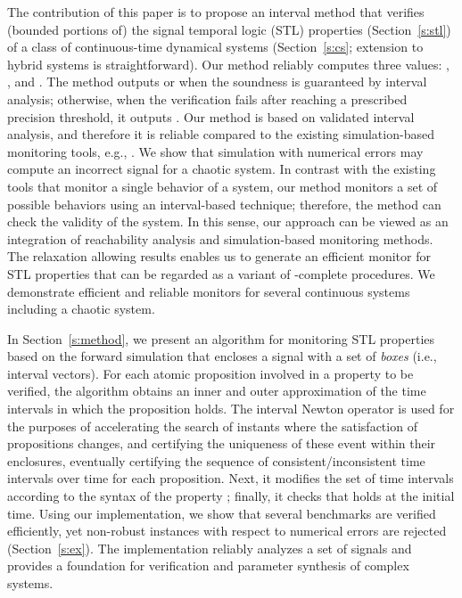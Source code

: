 \documentclass[paper]{ieice}
\begin{document}
The contribution of this paper is to propose an interval method that verifies (bounded portions of) the signal temporal logic (STL) properties (Section~\ref{s:stl}) of a class of continuous-time dynamical systems (Section~\ref{s:cs}; extension to hybrid systems is straightforward).
Our method reliably computes three values: , , and . The method outputs  or  when the soundness is guaranteed by interval analysis;
otherwise, when the verification fails after reaching a prescribed precision threshold, it outputs .
Our method is based on validated interval analysis, and therefore it is reliable compared to the existing simulation-based monitoring tools, e.g., \cite{Maler2003,Fainekos2006a,Donze2010,Donze2010a}.
We show that simulation with numerical errors may compute an incorrect signal for a chaotic system.
In contrast with the existing tools that monitor a single behavior of a system,
our method monitors a set of possible behaviors using an interval-based technique;
therefore, the method can check the validity of the system.
In this sense, our approach can be viewed as an integration of reachability analysis and simulation-based monitoring methods.
The relaxation allowing  results enables us to generate an efficient monitor for STL properties that can be regarded as a variant of -complete procedures.
We demonstrate efficient and reliable monitors for several continuous systems including a chaotic system.

In Section~\ref{s:method}, we present an algorithm for monitoring STL properties based on the forward simulation that encloses a signal with a set of \emph{boxes} (i.e., interval vectors). 
For each atomic proposition involved in a property  to be verified, the algorithm obtains an inner and outer approximation of the time intervals in which the proposition holds. The interval Newton operator is used for the purposes of accelerating the search of instants where the satisfaction of propositions changes, and certifying the uniqueness of these event within their enclosures, eventually certifying the sequence of consistent/inconsistent time intervals over time for each proposition.
Next, it modifies the set of time intervals according to the syntax of the property ; finally, it checks that  holds at the initial time.
Using our implementation, we show that several benchmarks are verified efficiently, yet non-robust instances with respect to numerical errors are rejected (Section~\ref{s:ex}).
The implementation reliably analyzes a set of signals and provides a foundation for verification and parameter synthesis of complex systems.
\end{document}
